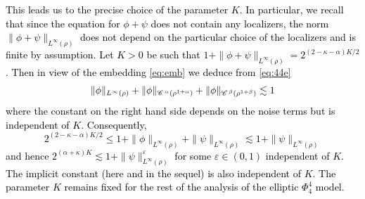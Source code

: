 \documentclass[a4paper,11pt]{article}
\renewcommand{\leq}{\leqslant}
\numberwithin{equation}{section}
\newcommand{\CC}{\mathscr{C} \hspace{.1em}}
\newcommand{\rmbb}[1]{\textcolor{black}{#1}}
\newcommand{\8}{\infty}
\begin{document}
\rmbb{This leads us to the precise choice of the parameter $K$. In particular, we recall that since the equation for $\phi+\psi$ does not contain any localizers, the norm $\|\phi+\psi\|_{L^{\infty} (\rho)}$ does not depend on the particular choice of the localizers and is finite by assumption.
Let $K>0$ be such that $1+\|\phi+\psi\|_{L^\infty(\rho)}= 2^{(2-\kappa-\alpha)K/2}$. Then  in view of the embedding \eqref{eq:emb} we deduce from \eqref{eq:44e}
\begin{equation*}%
\| \phi \|_{L^{\infty} (\rho)} + \| \phi \|_{\CC^{\alpha} (\rho^{1 +
   \alpha})}+ \| \phi \|_{\CC^{\beta} (\rho^{1 +
   \beta})} \lesssim 1
   \end{equation*}
  where the constant on the right hand side depends on the noise terms but  is independent of $ K$.
  Consequently,
  $$2^{(2-\kappa-\alpha)K/2}\leq 1+\|\phi\|_{L^\infty(\rho)}+\|\psi\|_{L^\infty(\rho)}\lesssim 1+\|\psi\|_{L^\infty(\rho)}$$
 and hence $2^{(\alpha+\kappa)K}\lesssim 1+ \|\psi\|_{L^\infty(\rho)}^{\varepsilon} $ for some $\varepsilon\in (0,1)$ independent of $K$. The implicit constant (here and in the sequel) is also independent of $K$. The parameter $K$ remains fixed for the rest of the analysis of the elliptic $\Phi^{4}_{4}$ model.} 
% 
\end{document}
